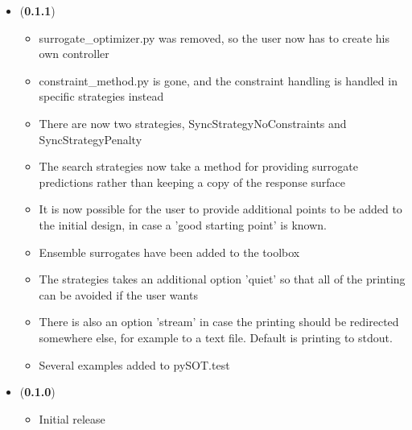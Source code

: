 \documentclass[]{article}
\begin{document}
\begin{itemize}
\item (\textbf{0.1.1})
\begin{itemize}
\item surrogate\_optimizer.py was removed, so the user now has to create his own controller
\item constraint\_method.py is gone, and the constraint handling is handled in specific strategies instead
\item 	There are now two strategies, SyncStrategyNoConstraints and SyncStrategyPenalty
\item The search strategies now take a method for providing surrogate predictions rather than keeping a copy of the response surface
\item It is now possible for the user to provide additional points to be added to the initial design, in case a 'good starting point' is known.
\item Ensemble surrogates have been added to the toolbox
\item 	The strategies takes an additional option 'quiet' so that all of the printing can be avoided if the user wants
\item There is also an option 'stream' in case the printing should be redirected somewhere else, for example to a text file. Default is printing to stdout.
\item 	Several examples added to pySOT.test
\end{itemize}
\item (\textbf{0.1.0})
\begin{itemize}
\item 	Initial release
\end{itemize}
\end{itemize}
\end{document}
